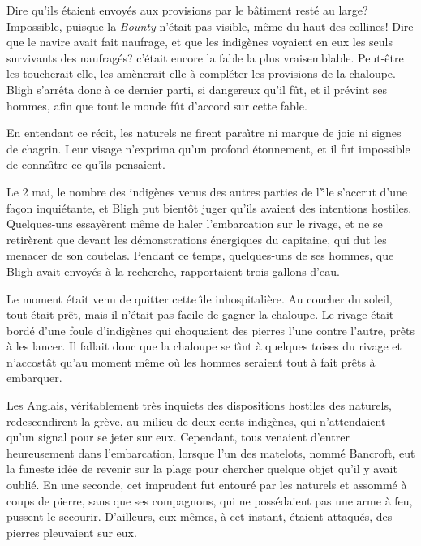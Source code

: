 Dire qu'ils \'etaient envoy\'es aux provisions
par le b\^atiment rest\'e au large?
Impossible, puisque la {\sl Bounty\/} n'\'etait pas
visible, m\^eme du haut des collines! Dire que le navire
avait fait naufrage, et que les indig\`enes voyaient
en eux les seuls survivants des naufrag\'es? c'\'etait
encore la fable la plus vraisemblable. Peut-\^etre les
toucherait-elle, les am\`enerait-elle \`a
compl\'eter les provisions de la chaloupe.
Bligh s'arr\^eta donc \`a ce dernier parti,
si dangereux qu'il f\^ut, et il pr\'evint ses hommes,
afin que tout le monde f\^ut d'accord sur cette fable.

En entendant ce r\'ecit, les naturels ne firent
para{\^\i}tre ni marque de joie ni signes de chagrin.
Leur visage n'exprima qu'un profond \'etonnement,
et il fut impossible de conna{\^\i}tre ce qu'ils pensaient.

Le 2 mai, le nombre des indig\`enes venus des autres
parties de l'{\^\i}le s'accrut d'une fa\c{c}on
inqui\'etante, et Bligh put bient\^ot juger qu'ils
avaient des intentions hostiles. Quelques-uns
essay\`erent m\^eme de haler l'embarcation sur
le rivage, et ne se retir\`erent que devant les
d\'emonstrations \'energiques du capitaine, qui dut
les menacer de son coutelas. Pendant ce temps,
quelques-uns de ses hommes, que Bligh avait envoy\'es
\`a la recherche, rapportaient trois gallons d'eau.

Le moment \'etait venu de quitter cette {\^\i}le
inhospitali\`ere. Au coucher du soleil, tout \'etait
pr\^et, mais il n'\'etait pas facile de gagner
la chaloupe. Le rivage \'etait bord\'e d'une
foule d'indig\`enes qui choquaient des pierres l'une
contre l'autre, pr\^ets \`a les lancer.
Il fallait donc que la chaloupe se t{\^\i}nt \`a quelques
toises du rivage et n'accost\^at qu'au moment m\^eme o\`u
les hommes seraient tout \`a fait pr\^ets \`a embarquer.

Les Anglais, v\'eritablement tr\`es inquiets
des dispositions hostiles des naturels, redescendirent
la gr\`eve, au milieu de deux cents indig\`enes,
qui n'attendaient qu'un signal pour se jeter sur eux.
Cependant, tous venaient d'entrer heureusement dans
l'embarcation, lorsque l'un des matelots, nomm\'e
Bancroft, eut la funeste id\'ee de revenir sur
la plage pour chercher quelque objet qu'il y avait
oubli\'e. En une seconde, cet imprudent fut
entour\'e par les naturels et assomm\'e
\`a coups de pierre, sans que ses compagnons,
qui ne poss\'edaient pas une arme \`a feu,
pussent le secourir. D'ailleurs, eux-m\^emes,
\`a cet instant, \'etaient attaqu\'es,
des pierres pleuvaient sur eux.

